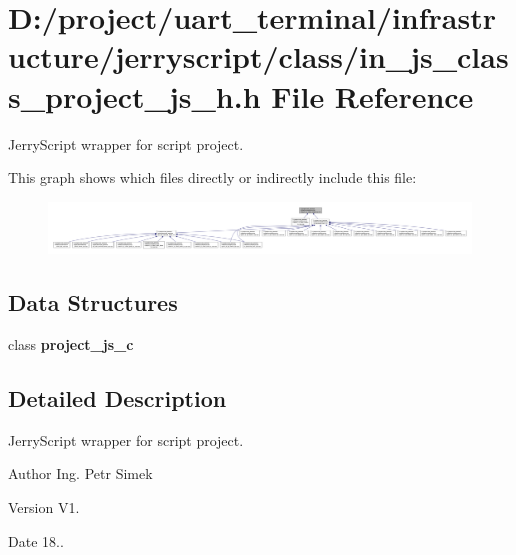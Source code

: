 \section{D\+:/project/uart\+\_\+terminal/infrastructure/jerryscript/class/in\+\_\+js\+\_\+class\+\_\+project\+\_\+js\+\_\+h.h File Reference}
\label{in__js__class__project__js__h_8h}


Jerry\+Script wrapper for script project.  


This graph shows which files directly or indirectly include this file\+:
\nopagebreak
\begin{figure}[H]
\begin{center}
\leavevmode
\includegraphics[width=350pt]{in__js__class__project__js__h_8h__dep__incl}
\end{center}
\end{figure}
\subsection*{Data Structures}
\begin{DoxyCompactItemize}
\item 
class \textbf{ project\+\_\+js\+\_\+c}
\end{DoxyCompactItemize}


\subsection{Detailed Description}
Jerry\+Script wrapper for script project. 

\begin{DoxyAuthor}{Author}
Ing. Petr Simek 
\end{DoxyAuthor}
\begin{DoxyVersion}{Version}
V1. 
\end{DoxyVersion}
\begin{DoxyDate}{Date}
18.. 
\end{DoxyDate}
